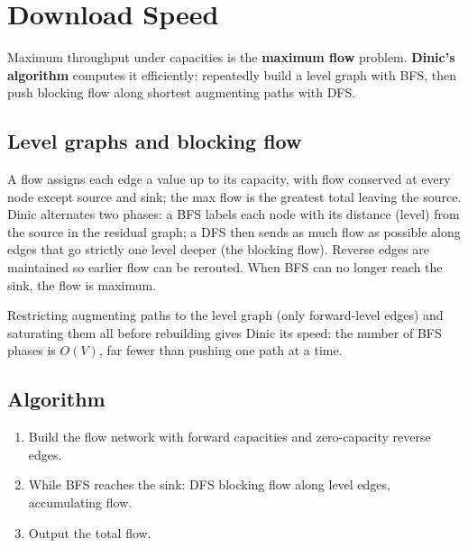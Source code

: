 \section{Download Speed}
\label{sec:cses-download-speed}


\begin{patternbox}
Maximum throughput under capacities is the \textbf{maximum flow} problem.
\textbf{Dinic's algorithm} computes it efficiently: repeatedly build a
level graph with BFS, then push blocking flow along shortest augmenting
paths with DFS.
\end{patternbox}

\subsection*{Level graphs and blocking flow}

A flow assigns each edge a value up to its capacity, with flow conserved at
every node except source and sink; the max flow is the greatest total
leaving the source. Dinic alternates two phases: a BFS labels each node with
its distance (level) from the source in the residual graph; a DFS then sends
as much flow as possible along edges that go strictly one level deeper (the
blocking flow). Reverse edges are maintained so earlier flow can be
rerouted. When BFS can no longer reach the sink, the flow is maximum.

\begin{ideabox}
Restricting augmenting paths to the level graph (only forward-level edges)
and saturating them all before rebuilding gives Dinic its speed: the number
of BFS phases is $O(V)$, far fewer than pushing one path at a time.
\end{ideabox}

\subsection*{Algorithm}

\begin{enumerate}
  \item Build the flow network with forward capacities and zero-capacity
        reverse edges.
  \item While BFS reaches the sink: DFS blocking flow along level edges,
        accumulating flow.
  \item Output the total flow.
\end{enumerate}

